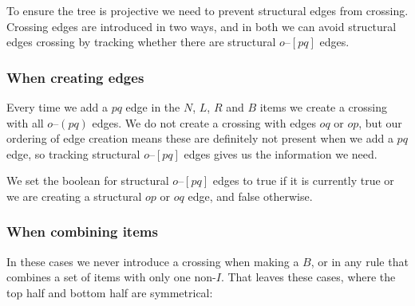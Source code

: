 To ensure the tree is projective we need to prevent structural edges from crossing.
Crossing edges are introduced in two ways, and in both we can avoid structural edges crossing by tracking whether there are structural $o$--$[pq]$ edges.

\subsubsection{When creating edges}
Every time we add a $pq$ edge in the $N$, $L$, $R$ and $B$ items we create a crossing with all $o$--$(pq)$ edges.
We do not create a crossing with edges $oq$ or $op$, but our ordering of edge creation means these are definitely not present when we add a $pq$ edge, so tracking structural $o$--$[pq]$ edges gives us the information we need.

We set the boolean for structural $o$--$[pq]$ edges to true if it is currently true or we are creating a structural $op$ or $oq$ edge, and false otherwise.

\subsubsection{When combining items}
In these cases we never introduce a crossing when making a $B$, or in any rule that combines a set of items with only one non-$I$.
That leaves these cases, where the top half and bottom half are symmetrical:

